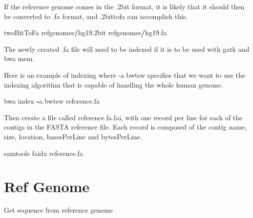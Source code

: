 \documentclass[]{book}
\newenvironment{Shaded}{\begin{snugshade}}{\end{snugshade}}
\newcommand{\FloatTok}[1]{\textcolor[rgb]{0.00,0.00,0.81}{#1}}
\newcommand{\NormalTok}[1]{#1}
\newcommand{\OperatorTok}[1]{\textcolor[rgb]{0.81,0.36,0.00}{\textbf{#1}}}
\begin{document}
If the reference genome comes in the .2bit format, it is likely that it should then be converted to .fa format, and .2bittofa can accomplish this.

\begin{Shaded}
\begin{Highlighting}[]
\NormalTok{twoBitToFa refgenomes}\OperatorTok{/}\NormalTok{hg19}\FloatTok{.2}\NormalTok{bit refgenomes}\OperatorTok{/}\NormalTok{hg19.fa}
\end{Highlighting}
\end{Shaded}

The newly created .fa file will need to be indexed if it is to be used with gatk and bwa mem.

Here is an example of indexing where -a bwtsw specifies that we want to use the indexing algorithm that is capable of handling the whole human genome.

\begin{Shaded}
\begin{Highlighting}[]
\NormalTok{bwa index }\OperatorTok{-}\NormalTok{a bwtsw reference.fa}
\end{Highlighting}
\end{Shaded}

Then create a file called reference.fa.fai, with one record per line for each of the contigs in the FASTA reference file. Each record is composed of the contig name, size, location, basesPerLine and bytesPerLine.

\begin{Shaded}
\begin{Highlighting}[]
\NormalTok{samtools faidx reference.fa}
\end{Highlighting}
\end{Shaded}

\hypertarget{ref-genome}{%
\section{Ref Genome}\label{ref-genome}}

Get sequence from reference genome
\end{document}
